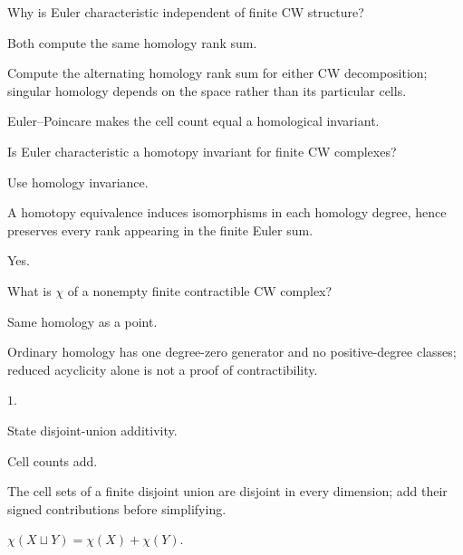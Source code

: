 \begin{exercise}\label{exr:viii21-14}
Why is Euler characteristic independent of finite CW structure?
\end{exercise}
\begin{hint}
Both compute the same homology rank sum.

Compute the alternating homology rank sum for either CW decomposition; singular homology depends on the space rather than its particular cells.
\end{hint}
\begin{solution}
Euler--Poincare makes the cell count equal a homological invariant.
\end{solution}

\begin{exercise}\label{exr:viii21-15}
Is Euler characteristic a homotopy invariant for finite CW complexes?
\end{exercise}
\begin{hint}
Use homology invariance.

A homotopy equivalence induces isomorphisms in each homology degree, hence preserves every rank appearing in the finite Euler sum.
\end{hint}
\begin{solution}
Yes.
\end{solution}

\begin{exercise}\label{exr:viii21-16}
What is \(\chi\) of a nonempty finite contractible CW complex?
\end{exercise}
\begin{hint}
Same homology as a point.

Ordinary homology has one degree-zero generator and no positive-degree classes; reduced acyclicity alone is not a proof of contractibility.
\end{hint}
\begin{solution}
\(1\).
\end{solution}

\begin{exercise}\label{exr:viii21-17}
State disjoint-union additivity.
\end{exercise}
\begin{hint}
Cell counts add.

The cell sets of a finite disjoint union are disjoint in every dimension; add their signed contributions before simplifying.
\end{hint}
\begin{solution}
\(\chi(X\sqcup Y)=\chi(X)+\chi(Y)\).
\end{solution}

